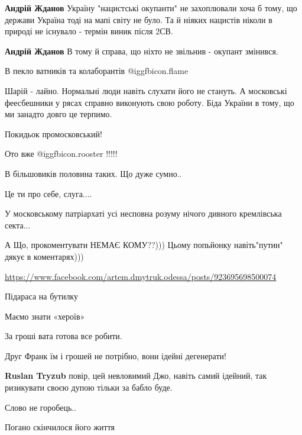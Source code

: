 \begin{itemize}
\begin{itemize} %
\textbf{Андрій Жданов} Україну "нацистські окупанти" не захоплювали хоча б тому, що держави Україна тоді на мапі світу не було.
Та й ніяких нацистів ніколи в природі не існувало - термін виник після 2СВ.

\textbf{Андрій Жданов} В тому й справа, що ніхто не звільнив - окупант змінився.
\end{itemize} %

В пекло ватників та колаборантів  @igg{fbicon.flame} 

Шарій - лайно. Нормальні люди навіть слухати його не стануть.
А московські феесбешники у рясах справно виконують свою роботу.
Біда України в тому, що ми занадто довго це терпимо.

Покидьок промосковський!

Ото вже  @igg{fbicon.rooster} !!!!!

В більшовиків половина таких. Що дуже сумно..

Це ти про себе, слуга....

У московському патріархаті усі несповна розуму нічого дивного кремлівська секта...

А Що, прокоментувати НЕМАЄ КОМУ??)))
Цьому попьйонку навіть"путин" дякує в коментарях)))

\url{https://www.facebook.com/artem.dmytruk.odessa/posts/923695698500074}

Підараса на бутилку

Маємо знати «хероїв»

За гроші вата готова все робити.

\begin{itemize} %
Друг Франк їм і грошей не потрібно, вони ідейні дегенерати!

\textbf{Ruslan Tryzub} повір, цей невловимий Джо, навіть самий ідейний, так ризикувати своєю дупою тільки за бабло буде.
\end{itemize} %

Слово не горобець..

Погано скінчилося його життя



\end{itemize}
